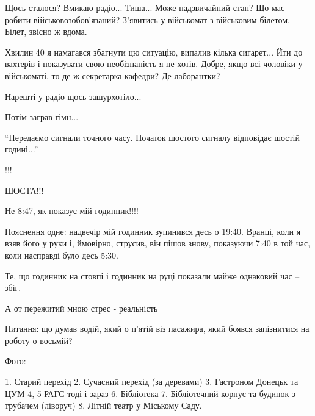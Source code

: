 \obeycr
Щось сталося?
Вмикаю радіо...
Тиша...
Може надзвичайний стан?
Що має робити військовозобов'язаний?
З'явитись у військомат з військовим білетом. 
Білет, звісно ж вдома.
\restorecr

Хвилин 40 я намагався збагнути цю ситуацію, випалив кілька сигарет... Йти до
вахтерів і показувати свою необізнаність я не хотів. Добре, якщо всі
чоловіки у військоматі, то де ж секретарка кафедри? Де лаборантки?

Нарешті у радіо щось зашурхотіло...

Потім заграв гімн...

\enquote{Передаємо сигнали точного часу. Початок шостого сигналу відповідає шостій годині...}

!!!

ШОСТА!!!

Не 8:47, як показує мій годинник!!!!

Пояснення одне: надвечір мій годинник зупинився десь о 19:40. Вранці, коли я
взяв його у руки і, ймовірно, струсив, він пішов знову, показуючи 7:40 в той
час, коли насправді було десь 5:30. 

Те, що годинник на стовпі і годинник на руці показали майже однаковий час – збіг.

А от пережитий мною стрес - реальність

Питання: що думав водій, який о п'ятій віз пасажира, який боявся запізнитися на роботу о восьмій?

Фото:

1. Старий перехід
2. Сучасний перехід (за деревами)
3. Гастроном Донецьк та ЦУМ
4, 5 РАГС тоді і зараз
6. Бібліотека
7. Бібліотечний корпус та будинок з трубачем (ліворуч)
8. Літній театр у Міському Саду.
